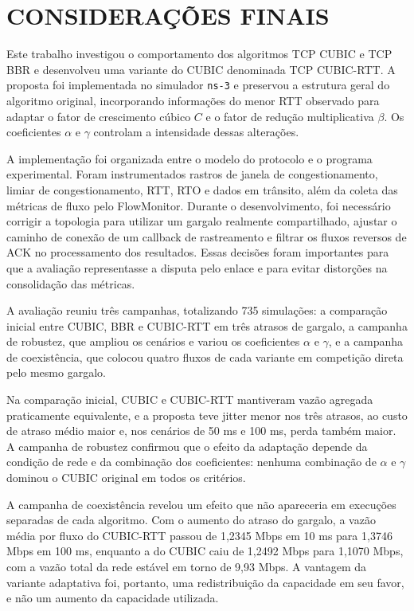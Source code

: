 \documentclass[a4paper,12pt]{monografia}
\begin{document}
\section{CONSIDERAÇÕES FINAIS}

Este trabalho investigou o comportamento dos algoritmos TCP CUBIC e TCP BBR e desenvolveu uma variante do CUBIC denominada TCP CUBIC-RTT. A proposta foi implementada no simulador \texttt{ns-3} e preservou a estrutura geral do algoritmo original, incorporando informações do menor RTT observado para adaptar o fator de crescimento cúbico $C$ e o fator de redução multiplicativa $\beta$. Os coeficientes $\alpha$ e $\gamma$ controlam a intensidade dessas alterações.

A implementação foi organizada entre o modelo do protocolo e o programa experimental. Foram instrumentados rastros de janela de congestionamento, limiar de congestionamento, RTT, RTO e dados em trânsito, além da coleta das métricas de fluxo pelo FlowMonitor. Durante o desenvolvimento, foi necessário corrigir a topologia para utilizar um gargalo realmente compartilhado, ajustar o caminho de conexão de um callback de rastreamento e filtrar os fluxos reversos de ACK no processamento dos resultados. Essas decisões foram importantes para que a avaliação representasse a disputa pelo enlace e para evitar distorções na consolidação das métricas.

A avaliação reuniu três campanhas, totalizando 735 simulações: a comparação inicial entre CUBIC, BBR e CUBIC-RTT em três atrasos de gargalo, a campanha de robustez, que ampliou os cenários e variou os coeficientes $\alpha$ e $\gamma$, e a campanha de coexistência, que colocou quatro fluxos de cada variante em competição direta pelo mesmo gargalo.

Na comparação inicial, CUBIC e CUBIC-RTT mantiveram vazão agregada praticamente equivalente, e a proposta teve jitter menor nos três atrasos, ao custo de atraso médio maior e, nos cenários de 50 ms e 100 ms, perda também maior. A campanha de robustez confirmou que o efeito da adaptação depende da condição de rede e da combinação dos coeficientes: nenhuma combinação de $\alpha$ e $\gamma$ dominou o CUBIC original em todos os critérios.

A campanha de coexistência revelou um efeito que não apareceria em execuções separadas de cada algoritmo. Com o aumento do atraso do gargalo, a vazão média por fluxo do CUBIC-RTT passou de 1,2345 Mbps em 10 ms para 1,3746 Mbps em 100 ms, enquanto a do CUBIC caiu de 1,2492 Mbps para 1,1070 Mbps, com a vazão total da rede estável em torno de 9,93 Mbps. A vantagem da variante adaptativa foi, portanto, uma redistribuição da capacidade em seu favor, e não um aumento da capacidade utilizada.
\end{document}
